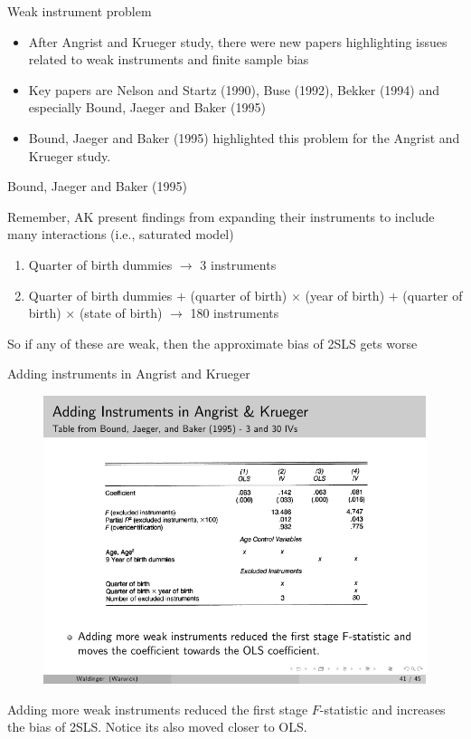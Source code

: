 \documentclass{beamer}
\begin{document}
\begin{frame}{Weak instrument problem}

\begin{itemize}
	\item After Angrist and Krueger study, there were new papers highlighting issues related to weak instruments and finite sample bias
	\item Key papers are Nelson and Startz (1990), Buse (1992), Bekker (1994) and especially Bound, Jaeger and Baker (1995)
	\item Bound, Jaeger and Baker (1995) highlighted this problem for the Angrist and Krueger study.  
\end{itemize}

\end{frame}

\begin{frame}{Bound, Jaeger and Baker (1995)}

Remember, AK present findings from expanding their instruments to include many interactions (i.e., saturated model)
		\begin{enumerate}
		\item Quarter of birth dummies $\rightarrow$ 3 instruments
		\item Quarter of birth dummies $+$ (quarter of birth) $\times$ (year of birth) $+$ (quarter of birth) $\times$ (state of birth) $\rightarrow$ 180 instruments
		\end{enumerate}
So if any of these are weak, then the approximate bias of 2SLS gets worse

\end{frame}


\begin{frame}{Adding instruments in Angrist and Krueger}
	
	\begin{figure}
	\includegraphics{./lecture_includes/ak_iv1.pdf}
	\end{figure}
	
Adding more weak instruments reduced the first stage $F$-statistic and increases the bias of 2SLS. Notice its also moved closer to OLS. 
	
\end{frame}
\end{document}

